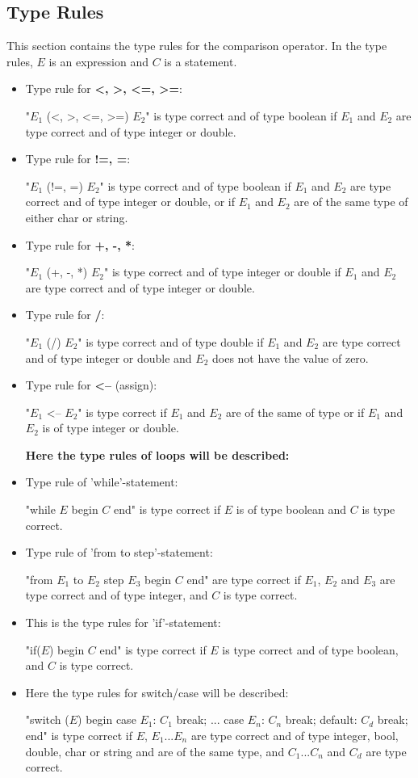 \subsection{Type Rules}
This section contains the type rules for the comparison operator. In the type rules, $E$ is an expression and $C$ is a statement.
\begin{itemize}
\item Type rule for \textbf{<, >, <=, >=}:

"$E_1$ (<, >, <=, >=) $E_2$" is type correct and of type boolean if $E_1$ and $E_2$ are type correct and of type integer or double.

\item Type rule for \textbf{!=, =}:

"$E_1$ (!=, =) $E_2$" is type correct and of type boolean if $E_1$ and $E_2$ are type correct and of type integer or double, or if $E_1$ and $E_2$ are of the same type of either char or string.

\item Type rule for \textbf{+, -, *}:

"$E_1$ (+, -, *) $E_2$" is type correct and of type integer or double if $E_1$ and $E_2$ are type correct and of type integer or double.

\item Type rule for \textbf{/}:

"$E_1$ (/) $E_2$" is type correct and of type double if $E_1$ and $E_2$ are type correct and of type integer or double and $E_2$ does not have the value of zero.

\item Type rule for \textbf{<--} (assign):

"$E_1$ <-- $E_2$" is type correct if $E_1$ and $E_2$ are of the same of type or if $E_1$ and $E_2$ is of type integer or double.

\textbf{Here the type rules of loops will be described:}

\item Type rule of 'while'-statement: 

"while $E$ begin $C$ end" is type correct if $E$ is of type boolean and $C$ is type correct.

\item Type rule of 'from to step'-statement: 

"from $E_1$ to $E_2$ step $E_3$ begin $C$ end" are type correct if $E_1$, $E_2$ and $E_3$ are type correct and of type integer, and $C$ is type correct.

\item This is the type rules for 'if'-statement:

"if($E$) begin $C$ end" is type correct if $E$ is type correct and of type boolean, and $C$ is type correct.

\item Here the type rules for switch/case will be described:

"switch ($E$) begin case $E_1$: $C_1$ break; ... case $E_n$: $C_n$ break; default: $C_d$ break; end" is type correct if $E$, $E_1$...$E_n$ are type correct and of type integer, bool, double, char or string and are of the same type, and $C_1$...$C_n$ and $C_d$ are type correct.
\end{itemize}